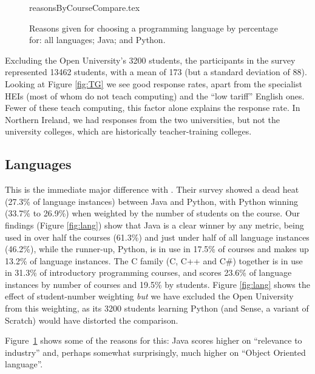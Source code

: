 \documentclass{sig-alternate}
\begin{document}
\begin{figure}
\begin{center}
{reasonsByCourseCompare.tex}
\end{center}\vskip-18pt
\caption{Reasons given for choosing a programming language by percentage for: all languages; Java; and Python.\label{fig:reasons}}
\end{figure}
\par
Excluding the Open University's 3200 students, the participants in the
survey represented 13462 students, with a mean of 173 (but a standard
deviation of 88). Looking at Figure \ref{fig:TG} we see good response
rates, apart from the specialist HEIs (most of whom do not teach
computing) and the ``low tariff'' English ones. Fewer of these teach
computing, %
this factor alone explains the response rate. In Northern Ireland, we
had responses from the two universities, but not the university
colleges, which are historically teacher-training colleges.

\subsection{Languages}

This is the immediate major difference with
\cite{mason+cooper:2014}. Their survey showed a dead heat (27.3\% of
language instances) between Java and Python, with Python winning (33.7\% to
26.9\%) when weighted by the number of students on the course.  Our
findings (Figure \ref{fig:lang}) show that Java is a clear winner by
any metric, being used in over half the courses (61.3\%) and just under half of all language instances (46.2\%), while the
runner-up, Python, is in use in 17.5\% of courses and makes up 13.2\% of language instances. The C family (C, C++ and C\#) together
is in use in 31.3\% of introductory programming courses, and scores 23.6\% of language instances by number of courses and 19.5\% by students. Figure
\ref{fig:lang} shows the effect of student-number weighting \emph{but}
we have excluded the Open University from this weighting, as its 3200
students learning Python (and Sense, a variant of Scratch) would have
distorted the comparison.



Figure~\ref{fig:reasons} shows some of the reasons for this: Java
scores higher on ``relevance to industry'' and, perhaps somewhat
surprisingly, much higher on ``Object Oriented language''.
\end{document}
